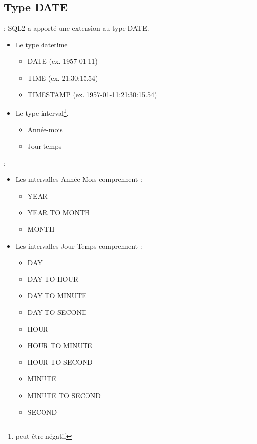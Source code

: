\documentclass[10pt]{beamer}
\begin{document}
\subsection{Type DATE}
\begin{frame}{\secname : \subsecname}
    SQL2 a apporté une extension au type DATE.
    \begin{itemize}
        \item Le type datetime
              \begin{itemize}
                  \item DATE (ex. 1957-01-11)
                  \item TIME (ex. 21:30:15.54)
                  \item TIMESTAMP (ex. 1957-01-11:21:30:15.54)
              \end{itemize}
        \item Le type interval\footnote{peut être négatif}.
              \begin{itemize}
                  \item Année-mois
                  \item Jour-temps
              \end{itemize}
    \end{itemize}
\end{frame}

\begin{frame}{\secname : \subsecname}
    \begin{itemize}
        \item Les intervalles Année-Mois comprennent :
              \begin{itemize}
                  \item YEAR
                  \item YEAR TO MONTH
                  \item MONTH
              \end{itemize}
        \item Les intervalles Jour-Temps  comprennent :
              \begin{itemize}
                  \item DAY
                  \item DAY TO HOUR
                  \item DAY TO MINUTE
                  \item DAY TO SECOND
                  \item HOUR
                  \item HOUR TO MINUTE
                  \item HOUR TO SECOND
                  \item MINUTE
                  \item MINUTE TO SECOND
                  \item SECOND
              \end{itemize}
    \end{itemize}
\end{frame}
\end{document}
